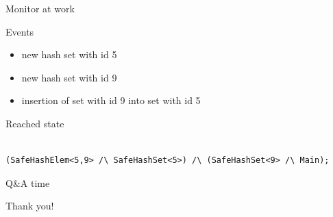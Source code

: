 \documentclass[10pt,usenames,dvipsnames]{beamer}
\begin{document}
\begin{frame}[fragile]{Monitor at work}
  \begin{block}{Events}
    \begin{itemize}
    \item  new hash set with id 5
    \item  new hash set with id 9
    \item insertion of set with id 9 into set with id 5  
    \end{itemize}
  \end{block}

  \begin{block}{Reached state}
    \begin{lstlisting}[basicstyle=\ttfamily\footnotesize]

(SafeHashElem<5,9> /\ SafeHashSet<5>) /\ (SafeHashSet<9> /\ Main);

    \end{lstlisting}
  \end{block}
\end{frame}


\begin{frame}{Q\&A time}
\vspace*{16ex}
  \begin{center}
  \LARGE Thank you!
\end{center}
\end{frame}
\end{document}

